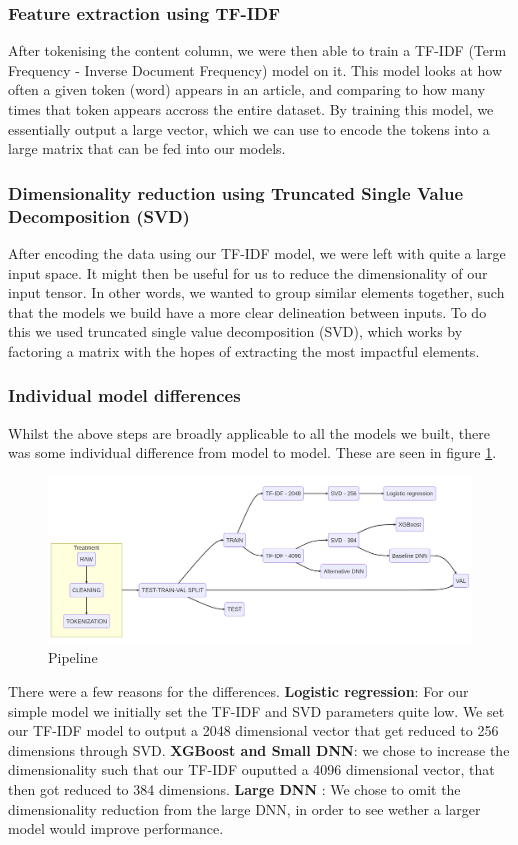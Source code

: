 \subsubsection{Feature extraction using TF-IDF}
After tokenising the content column, we were then able to train a TF-IDF (Term Frequency - Inverse Document Frequency)
model on it. This model looks at how often a given token (word) appears in an article, and comparing to how many times
that token appears accross the entire dataset. By training this model, we essentially output a large vector, which we can use to encode the tokens into a
large matrix that can be fed into our models.

\subsubsection{Dimensionality reduction using Truncated Single Value Decomposition (SVD)}
After encoding the data using our TF-IDF model, we were left with quite a large input space. It might then
be useful for us to reduce the dimensionality of our input tensor. In other words, we wanted to group similar elements together, such that the models we build have a more clear delineation between inputs. To do this we used
truncated single value decomposition (SVD), which works by factoring a matrix with the hopes of extracting the most impactful elements.

\subsubsection{Individual model differences}
Whilst the above steps are broadly applicable to all the models we built, there was some individual difference from
model to model. These are seen in figure \ref{fig:pipeline}.

\begin{figure}[htpb]
  \centering
  \includegraphics[width=1\textwidth]{pipeline}
  \caption{Pipeline}
  \label{fig:pipeline}
\end{figure}

There were a few reasons for the differences. \textbf{Logistic regression}: For our simple model we initially set the TF-IDF and SVD parameters quite low. We
    set our TF-IDF model to output a 2048 dimensional vector that get reduced to 256 dimensions through SVD.
    \textbf{XGBoost and Small DNN}: we chose to increase the dimensionality such that our TF-IDF ouputted a 4096
    dimensional vector, that then got reduced to 384 dimensions. \textbf{Large DNN} : We chose to omit the
    dimensionality reduction from the large DNN, in order to see wether a larger model would improve performance.

